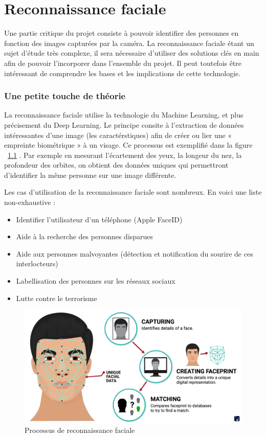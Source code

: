 \chapter{Reconnaissance faciale}
\label{ch:reco_faciale}

Une partie critique du projet consiste à pouvoir identifier des personnes en fonction des images capturées par la
caméra. La reconnaissance faciale étant un sujet d’étude très complexe, il sera nécessaire d’utiliser des solutions
clés en main afin de pouvoir l’incorporer dans l’ensemble du projet. Il peut toutefois être intéressant de
comprendre les bases et les implications de cette technologie.

\subsection{Une petite touche de théorie}
La reconnaissance faciale utilise la technologie du Machine Learning, et plus précisement du Deep Learning.
Le principe consite à l’extraction de données intéressantes d’une image (les caractérstiques) afin de créer ou lier une
« empreinte biométrique » à un visage. Ce processus est exemplifié dans la figure ~\ref{fig:reco-process} . Par exemple en mesurant l’écartement des yeux, la longeur du nez, la
profondeur des orbites, on obtient des données uniques qui permettront d’identifier la même personne sur une
image différente.

Les cas d’utilisation de la reconnaissance faciale sont nombreux.
En voici une liste non-exhaustive :
\begin{itemize}
\item Identifier l’utilisateur d’un téléphone (Apple FaceID)
\item Aide à la recherche des personnes disparues
\item Aide aux personnes malvoyantes (détection et notification du sourire de ces interlocteurs)
\item Labellisation des personnes sur les réseaux sociaux
\item Lutte contre le terrorisme
\end{itemize}

\begin{figure}[H]
	\centering
	\includegraphics[width=12cm]{images/proto-5.png}
	\caption{Processus de reconnaissance faciale}
	\label{fig:reco-process}
\end{figure}


